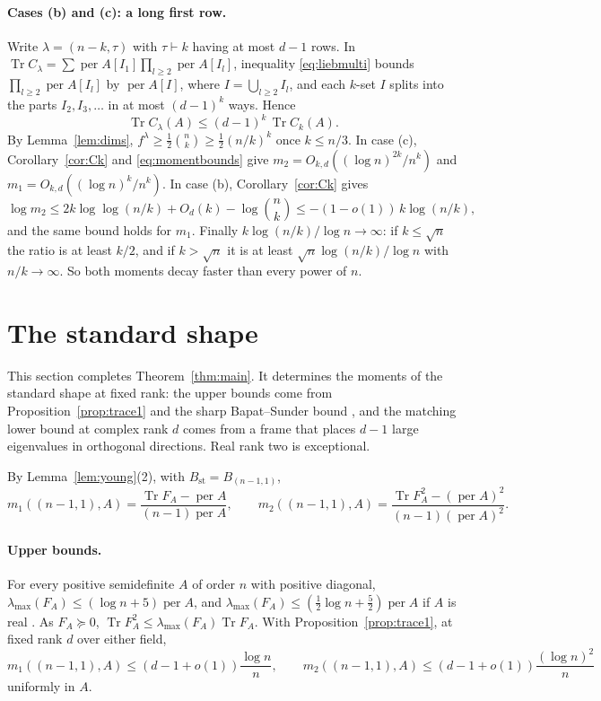 \documentclass[11pt,a4paper]{article}
\theoremstyle{remark}
\newcommand{\per}{\operatorname{per}}
\newcommand{\Tr}{\operatorname{Tr}}
\newcommand{\std}{\mathrm{st}}
\begin{document}
\paragraph{Cases (b) and (c): a long first row.} Write $\lambda=(n-k,\tau)$ with $\tau\vdash k$ having at most $d-1$ rows. In $\Tr C_\lambda=\sum\per A[I_1]\prod_{l\ge2}\per A[I_l]$, inequality \eqref{eq:liebmulti} bounds $\prod_{l\ge2}\per A[I_l]$ by $\per A[I]$, where $I=\bigcup_{l\ge2}I_l$, and each $k$-set $I$ splits into the parts $I_2,I_3,\dots$ in at most $(d-1)^k$ ways. Hence
\[
 \Tr C_\lambda(A)\le(d-1)^k\,\Tr C_k(A).
\]
By Lemma~\ref{lem:dims}, $f^\lambda\ge\frac12\binom nk\ge\frac12(n/k)^k$ once $k\le n/3$. In case (c), Corollary~\ref{cor:Ck} and \eqref{eq:momentbounds} give $m_2=O_{k,d}((\log n)^{2k}/n^k)$ and $m_1=O_{k,d}((\log n)^k/n^k)$. In case (b), Corollary~\ref{cor:Ck} gives
\[
 \log m_2\le2k\log\log(n/k)+O_d(k)-\log\binom nk\le-(1-o(1))\,k\log(n/k),
\]
and the same bound holds for $m_1$. Finally $k\log(n/k)/\log n\to\infty$: if $k\le\sqrt n$ the ratio is at least $k/2$, and if $k>\sqrt n$ it is at least $\sqrt n\log(n/k)/\log n$ with $n/k\to\infty$. So both moments decay faster than every power of $n$.

\section{The standard shape}\label{sec:standard}
This section completes Theorem~\ref{thm:main}. It determines the moments of the standard shape at fixed rank: the upper bounds come from Proposition~\ref{prop:trace1} and the sharp Bapat--Sunder bound \cite{EPBS}, and the matching lower bound at complex rank $d$ comes from a frame that places $d-1$ large eigenvalues in orthogonal directions. Real rank two is exceptional.

By Lemma~\ref{lem:young}(2), with $B_\std=B_{(n-1,1)}$,
\begin{equation}\label{eq:stdmoments}
 m_1((n-1,1),A)=\frac{\Tr F_A-\per A}{(n-1)\per A},\qquad
 m_2((n-1,1),A)=\frac{\Tr F_A^2-(\per A)^2}{(n-1)(\per A)^2}.
\end{equation}

\paragraph{Upper bounds.} For every positive semidefinite $A$ of order $n$ with positive diagonal, $\lambda_{\max}(F_A)\le(\log n+5)\per A$, and $\lambda_{\max}(F_A)\le(\frac12\log n+\frac52)\per A$ if $A$ is real \cite[Proposition~2.4]{EPBS}. As $F_A\succeq0$, $\Tr F_A^2\le\lambda_{\max}(F_A)\Tr F_A$. With Proposition~\ref{prop:trace1}, at fixed rank $d$ over either field,
\[
 m_1((n-1,1),A)\le(d-1+o(1))\frac{\log n}n,\qquad m_2((n-1,1),A)\le(d-1+o(1))\frac{(\log n)^2}n
\]
uniformly in $A$.
\end{document}
